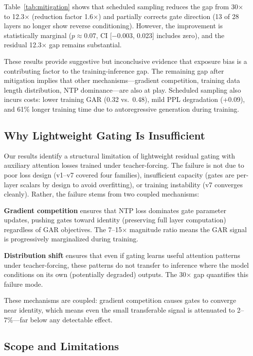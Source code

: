 \documentclass[11pt]{article}
\begin{document}
Table~\ref{tab:mitigation} shows that scheduled sampling reduces the gap from 30$\times$ to 12.3$\times$ (reduction factor 1.6$\times$) and partially corrects gate direction (13 of 28 layers no longer show reverse conditioning).
However, the improvement is statistically marginal ($p \approx 0.07$, CI [$-$0.003, 0.023] includes zero), and the residual 12.3$\times$ gap remains substantial.

These results provide suggestive but inconclusive evidence that exposure bias is a contributing factor to the training-inference gap.
The remaining gap after mitigation implies that other mechanisms---gradient competition, training data length distribution, NTP dominance---are also at play.
Scheduled sampling also incurs costs: lower training GAR (0.32 vs.\ 0.48), mild PPL degradation (+0.09), and 61\% longer training time due to autoregressive generation during training.

\subsection{Why Lightweight Gating Is Insufficient}

Our results identify a structural limitation of lightweight residual gating with auxiliary attention losses trained under teacher-forcing.
The failure is not due to poor loss design (v1--v7 covered four families), insufficient capacity (gates are per-layer scalars by design to avoid overfitting), or training instability (v7 converges cleanly).
Rather, the failure stems from two coupled mechanisms:

\textbf{Gradient competition} ensures that NTP loss dominates gate parameter updates, pushing gates toward identity (preserving full layer computation) regardless of GAR objectives.
The 7--15$\times$ magnitude ratio means the GAR signal is progressively marginalized during training.

\textbf{Distribution shift} ensures that even if gating learns useful attention patterns under teacher-forcing, these patterns do not transfer to inference where the model conditions on its own (potentially degraded) outputs.
The 30$\times$ gap quantifies this failure mode.

These mechanisms are coupled: gradient competition causes gates to converge near identity, which means even the small transferable signal is attenuated to 2--7\%---far below any detectable effect.

\subsection{Scope and Limitations}
\end{document}
